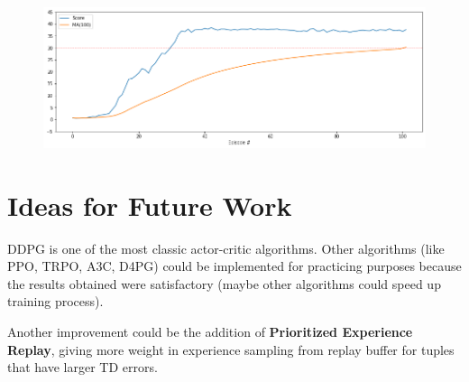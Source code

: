 \documentclass{article}
\begin{document}
\begin{figure}[H]
\centering
\centering
\includegraphics[scale=0.5]{img/score.png}
\label{fig:score}
\end{figure}

\section{Ideas for Future Work}

DDPG is one of the most classic actor-critic algorithms. Other algorithms (like PPO, TRPO, A3C, D4PG) could be implemented for practicing purposes because the results obtained were satisfactory (maybe other algorithms could speed up training process).

Another improvement could be the addition of \textbf{Prioritized Experience Replay}, giving more weight in experience sampling from replay buffer for tuples that have larger TD errors.
\end{document}
